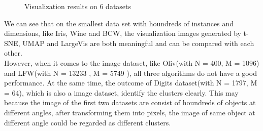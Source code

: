 \begin{figure}[H]
\centering  %
\caption{Visualization results on 6 datasets}
\end{figure}

\noindent We can see that on the smallest data set with houndreds of instances and dimensions, like Iris, Wine and BCW, the visualization images generated by t-SNE, UMAP and LargeVis are both meaningful and can be compared with each other. \\

\noindent However, when it comes to the image dataset, like Oliv(with N = 400, M = 1096) and LFW(with N = 13233 , M = 5749 ), all three algorithms do not have a good performance. At the same time, the outcome of Digits dataset(with N = 1797, M = 64), which is also a image dataset, identify the clusters clearly. This may because the image of the first two datasets are consist of houndreds of objects at different angles, after transforming them into pixels, the image of same object at different angle could be regarded as different clusters. \\

